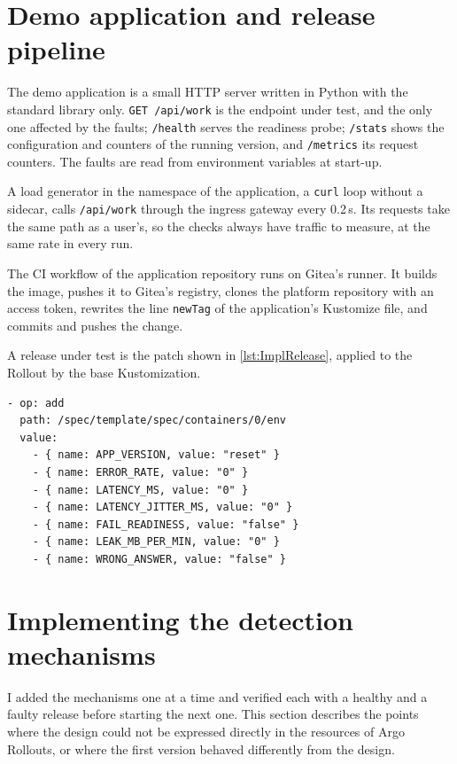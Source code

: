\section{Demo application and release pipeline}
\label{sec:ImplDemo}
The demo application is a small HTTP server written in Python with the standard library only. \texttt{GET /api/work} is the endpoint under test, and the only one affected by the faults; \texttt{/health} serves the readiness probe; \texttt{/stats} shows the configuration and counters of the running version, and \texttt{/metrics} its request counters. The faults are read from environment variables at start-up.

A load generator in the namespace of the application, a \texttt{curl} loop without a sidecar, calls \texttt{/api/work} through the ingress gateway every 0.2\,s. Its requests take the same path as a user's, so the checks always have traffic to measure, at the same rate in every run.

The CI workflow of the application repository runs on Gitea's runner. It builds the image, pushes it to Gitea's registry, clones the platform repository with an access token, rewrites the line \texttt{newTag} of the application's Kustomize file, and commits and pushes the change.

A release under test is the patch shown in \autoref{lst:ImplRelease}, applied to the Rollout by the base Kustomization.

\begin{lstlisting}[caption={The release file of the demo application (healthy values).},label=lst:ImplRelease]
- op: add
  path: /spec/template/spec/containers/0/env
  value:
    - { name: APP_VERSION, value: "reset" }
    - { name: ERROR_RATE, value: "0" }
    - { name: LATENCY_MS, value: "0" }
    - { name: LATENCY_JITTER_MS, value: "0" }
    - { name: FAIL_READINESS, value: "false" }
    - { name: LEAK_MB_PER_MIN, value: "0" }
    - { name: WRONG_ANSWER, value: "false" }
\end{lstlisting}

\section{Implementing the detection mechanisms}
\label{sec:ImplMechanisms}
I added the mechanisms one at a time and verified each with a healthy and a faulty release before starting the next one. This section describes the points where the design could not be expressed directly in the resources of Argo Rollouts, or where the first version behaved differently from the design.

